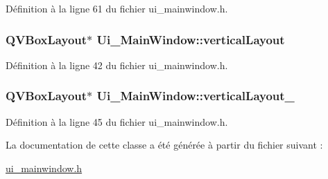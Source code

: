 Définition à la ligne 61 du fichier ui\-\_\-mainwindow.\-h.

\hypertarget{class_ui___main_window_aecd96a04789fcfec3f98d80390ad8184}{
\subsubsection[{vertical\-Layout}]{\setlength{\rightskip}{0pt plus 5cm}Q\-V\-Box\-Layout$\ast$ Ui\-\_\-\-Main\-Window\-::vertical\-Layout}}\label{class_ui___main_window_aecd96a04789fcfec3f98d80390ad8184}


Définition à la ligne 42 du fichier ui\-\_\-mainwindow.\-h.

\hypertarget{class_ui___main_window_a0c01bad60d9f422a1258e710635a2f65}{
\subsubsection[{vertical\-Layout\-\_\-2}]{\setlength{\rightskip}{0pt plus 5cm}Q\-V\-Box\-Layout$\ast$ Ui\-\_\-\-Main\-Window\-::vertical\-Layout\-\_}}\label{class_ui___main_window_a0c01bad60d9f422a1258e710635a2f65}


Définition à la ligne 45 du fichier ui\-\_\-mainwindow.\-h.



La documentation de cette classe a été générée à partir du fichier suivant \-:\begin{DoxyCompactItemize}
\item 
\hyperlink{ui__mainwindow_8h}{ui\-\_\-mainwindow.\-h}\end{DoxyCompactItemize}
